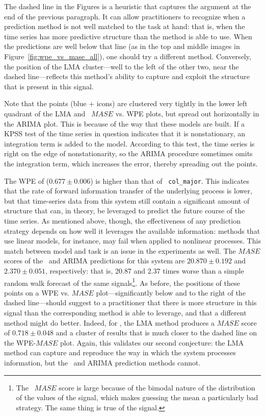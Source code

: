 The dashed line in the Figures is a heuristic that captures the
argument at the end of the previous paragraph.  It can allow
practitioners to recognize when a prediction method is not well
matched to the task at hand: that is, when the time series has more
predictive structure than the method is able to use.  When the
predictions are well below that line (as in the top and middle images
in Figure~\ref{fig:wpe_vs_mase_all}), one should try a different
method.  Conversely, the position of the LMA cluster---well to the
left of the other two, near the dashed line---reflects this method's
ability to capture and exploit the structure that is present in this
signal.

Note that the \col points (blue {\color{blue}$+$} icons) are clustered
very tightly in the lower left quadrant of the LMA and \naive ~$MASE$
vs. WPE plots, but spread out horizontally in the ARIMA plot.  This is
because of the way that these models are built.  If a KPSS test of the
time series in question indicates that it is nonstationary, an
integration term is added to the model.  According to this test, the
\col time series is right on the edge of nonstationarity, so the ARIMA
procedure sometimes omits the integration term, which increases the
error, thereby spreading out the points.

The WPE of \svdfive ($0.677 \pm 0.006$) is higher than that of {\tt
  col\_major}.  This indicates that the rate of forward information
transfer of the underlying process is lower, but that time-series data
from this system still contain a significant amount of structure that
can, in theory, be leveraged to predict the future course of the time
series.  As mentioned above, though, the effectiveness of any
prediction strategy depends on how well it leverages the available
information: methods that use linear models, for instance, may fail
when applied to nonlinear processes.
% 
% 
This match between model and task is an issue in the \svdfive
experiments as well.  The $MASE$ scores of the \naive ~and ARIMA
predictions for this system are $20.870 \pm 0.192$ and $2.370 \pm
0.051$, respectively: that is, 20.87 and 2.37 times worse than a
simple random walk forecast of the same signals\footnote{The \naive
  ~$MASE$ score is large because of the bimodal nature of the
  distribution of the values of the signal, which makes guessing the
  mean a particularly bad strategy.  The same thing is true of the
  \svdthree signal.}.  As before, the positions of these points on a
WPE vs. $MASE$ plot---significantly below and to the right of the
dashed line---should suggest to a practitioner that there is more
structure in this signal than the corresponding method is able to
leverage, and that a different method might do better.  Indeed, for
\svdfive, the LMA method produces a $MASE$ score of $ 0.718\pm 0.048 $
and a cluster of results that is much closer to the dashed line on the
WPE-$MASE$ plot.  Again, this validates our second conjecture: the LMA
method can capture and reproduce the way in which the \svdfive system
processes information, but the \naive ~and ARIMA prediction methods
cannot.

